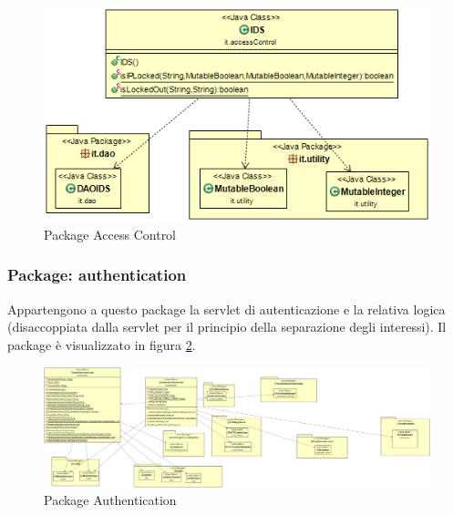 \begin{figure}[!htbp]
	\centering
	\includegraphics[scale = .6]{img/dependencies_accesscontrol.png}
	\caption{Package Access Control}
	\label{gfx:accesscontrol}
\end{figure}


\subsubsection{Package: \textbf{authentication}}

Appartengono a questo package la servlet di autenticazione e la relativa logica (disaccoppiata dalla servlet per il principio della separazione degli interessi). Il package è visualizzato in figura \ref{gfx:dependencies_authentication}.

\tiny 
\begin{landscape}
\begin{center}
\vspace*{\fill}
\begin{figure}[!htbp]
	\centering
	\includegraphics[scale = .3]{img/dependencies_authentication}
	\caption{Package Authentication}
	\label{gfx:dependencies_authentication}
\end{figure}
\vspace*{\fill}

\end{center}	

\end{landscape}%

